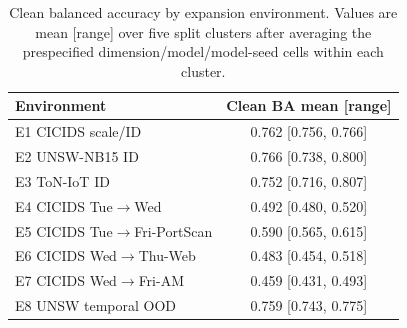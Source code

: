 \begin{table}[!t]
\caption{Clean balanced accuracy by expansion environment. Values are mean
[range] over five split clusters after averaging the prespecified
dimension/model/model-seed cells within each cluster.}
\label{tab:s-clean-env}
\centering
\footnotesize
\begin{tabular}{@{}lc@{}}
\toprule
Environment & Clean BA mean [range] \\
\midrule
E1 CICIDS scale/ID & 0.762 [0.756, 0.766] \\
E2 UNSW-NB15 ID & 0.766 [0.738, 0.800] \\
E3 ToN-IoT ID & 0.752 [0.716, 0.807] \\
E4 CICIDS Tue$\rightarrow$Wed & 0.492 [0.480, 0.520] \\
E5 CICIDS Tue$\rightarrow$Fri-PortScan & 0.590 [0.565, 0.615] \\
E6 CICIDS Wed$\rightarrow$Thu-Web & 0.483 [0.454, 0.518] \\
E7 CICIDS Wed$\rightarrow$Fri-AM & 0.459 [0.431, 0.493] \\
E8 UNSW temporal OOD & 0.759 [0.743, 0.775] \\
\bottomrule
\end{tabular}
\end{table}

